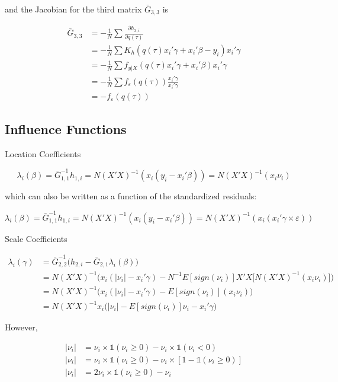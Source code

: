 \documentclass[
  authoryear,
  review,
  1p]{elsarticle}
\begin{document}
and the Jacobian for the third matrix \(\bar G_{3,3}\) is

\[\begin{aligned}
\bar G_{3,3} &= -\frac{1}{N} \sum \frac{\partial h_{3,i}}{\partial q(\tau)} \\
 &= -\frac{1}{N} \sum K_h(q(\tau) x_i'\gamma +x_i'\beta - y_i ) x_i'\gamma \\
 &= -\frac{1}{N} \sum f_{y|X}(q(\tau) x_i'\gamma +x_i'\beta) x_i'\gamma \\
 &= -\frac{1}{N} \sum f_{\varepsilon}(q(\tau)) \frac{x_i'\gamma}{ x_i'\gamma} \\
 &= - f_{\varepsilon}(q(\tau)) 
\end{aligned}
\]

\hypertarget{influence-functions}{%
\subsection{Influence Functions}\label{influence-functions}}

Location Coefficients

\[\lambda_i(\beta) = \bar G^{-1}_{1,1} h_{1,i} = N (X'X)^{-1}(x_i (y_i-x_i'\beta)) = N (X'X)^{-1}(x_i \nu_i)
\]

which can also be written as a function of the standardized residuals:

\[\lambda_i(\beta) = \bar G^{-1}_{1,1} h_{1,i} = N (X'X)^{-1}(x_i (y_i-x_i'\beta)) = N (X'X)^{-1}(x_i ( x_i'\gamma \times \varepsilon))
\]

Scale Coefficients

\[\begin{aligned}
\lambda_i(\gamma)&=\bar G_{2,2}^{-1}\Big(h_{2,i}-\bar G_{2,1} \lambda_i(\beta)\Big) \\
&=N (X'X)^{-1} \Big(x_i(|\nu_i|-x_i' \gamma) 
- N^{-1} E[sign(\nu_i)] X'X \big[ N (X'X)^{-1}(x_i \nu_i) \big] \Big) \\
&=N (X'X)^{-1} \Big(x_i(|\nu_i|-x_i' \gamma) - E[sign(\nu_i)] (x_i \nu_i)  \Big) \\
&=N (X'X)^{-1} x_i \Big( |\nu_i| - E[sign(\nu_i)] \nu_i -x_i' \gamma \Big) 
\end{aligned}
\]

However,

\[\begin{aligned}
|\nu_i| &= \nu_i \times \mathbb{1}(\nu_i \geq 0) - \nu_i \times \mathbb{1}(\nu_i < 0) \\
|\nu_i| &= \nu_i \times \mathbb{1}(\nu_i \geq 0) - \nu_i \times [1-\mathbb{1}(\nu_i \geq 0)] \\
|\nu_i| &= 2 \nu_i \times \mathbb{1}(\nu_i \geq 0) - \nu_i  
\end{aligned}
\]
\end{document}
